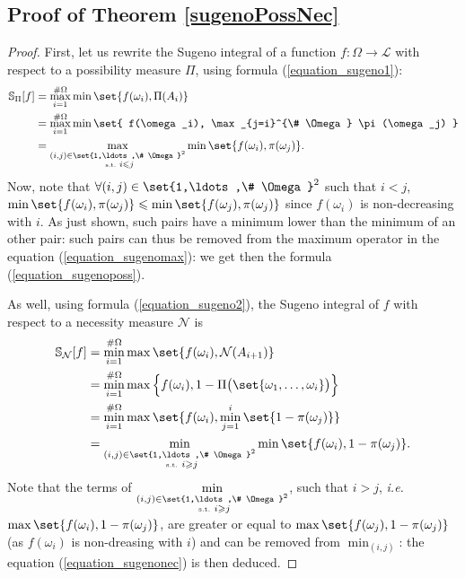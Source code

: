 \subsection{Proof of Theorem \ref{sugenoPossNec}}
\label{sugenoPossNec_RETURN}
\begin{proof}
First, let us rewrite the Sugeno integral of a function $f:\Omega \rightarrow \mathcal{L}$ 
with respect to a possibility measure $\Pi$, using formula (\ref{equation_sugeno1}): 
\begin{align}
\nonumber \mathbb{S}_{\Pi}[f] &= \max_{i=1}^{\# \Omega} \min \set{ f(\omega_i), \Pi(A_i) } \\
\nonumber &= \max_{i=1}^{\# \Omega} \min \set{  f(\omega_i), \max_{j=i}^{\# \Omega} \pi(\omega_j)  } \\
\label{equation_sugenomax} &= \max_{\substack{ (i,j) \in \set{1,\ldots,\# \Omega}^2  \\ \mbox{ \tiny s.t. } i \leqslant j} } \min \set{  f(\omega_i),  \pi(\omega_j)  }. 
\end{align}
Now, note that $\forall (i,j) \in \set{1,\ldots,\# \Omega}^2$ such that $i<j$,
$\min \set{ f(\omega_i), \pi(\omega_j) } \leqslant \min \set{ f(\omega_j), \pi(\omega_j) } $
since $f(\omega_i)$ is non-decreasing with $i$.
As just shown, such pairs 
have a minimum lower than the minimum of an other pair: 
such pairs can thus be removed 
from the maximum operator 
in the equation (\ref{equation_sugenomax}):
we get then the formula (\ref{equation_sugenoposs}).

As well, using formula (\ref{equation_sugeno2}),
the Sugeno integral of $f$ with respect to a necessity measure $\mathcal{N}$ is
\begin{align}
\nonumber \mathbb{S}_{\mathcal{N}}[f] &= \min_{i=1}^{\# \Omega} \max \set{ f(\omega_i), \mathcal{N}(A_{i+1}) } \\
\nonumber &= \min_{i=1}^{\# \Omega} \max \Big\{ f(\omega_i), 1 - \Pi \big( \set{\omega_1,\ldots,\omega_i} \big) \Big\} \\
\nonumber &= \min_{i=1}^{\# \Omega} \max \set{  f(\omega_i), \min_{j=1}^{i} \set{1 - \pi(\omega_j)}  } \\
\label{equation_sugenomin} &= \min_{\substack{ (i,j) \in \set{1,\ldots,\# \Omega}^2  \\ \mbox{ \tiny s.t. } i \geqslant j} } \min \set{  f(\omega_i), 1 - \pi(\omega_j)  }. 
\end{align}
Note that the terms of $\displaystyle \min_{\substack{ (i,j) \in \set{1,\ldots,\# \Omega}^2  \\ \mbox{ \tiny s.t. } i \geqslant j} }$,
such that $i>j$, \textit{i.e.} $\max \set{ f(\omega_i), 1-\pi(\omega_j) }$,
are greater or equal to $\max \set{ f(\omega_j), 1-\pi(\omega_j) }$
(as $f(\omega_i)$ is non-dreasing with $i$)
and can be removed from $\displaystyle \min_{(i,j)}$:
the equation (\ref{equation_sugenonec}) is then deduced.
\end{proof}





